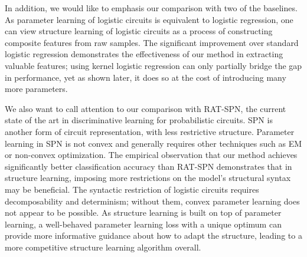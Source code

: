 \documentclass[letterpaper]{article} %
\begin{document}
In addition, we would like to emphasis our comparison with two of the baselines. As parameter learning of logistic circuits is equivalent to logistic regression, one can view structure learning of logistic circuits as a process of constructing composite features from raw samples.
The significant improvement over standard logistic regression demonstrates the effectiveness of our method in extracting valuable features; using kernel logistic regression can only partially bridge the gap in performance, yet as shown later, it does so at the cost of introducing many more parameters.

We also want to call attention to our comparison with RAT-SPN, the current state of the art in discriminative learning for probabilistic circuits. SPN is another form of circuit representation, with less restrictive structure. Parameter learning in SPN is not convex and generally requires other techniques such as EM or non-convex optimization. The empirical observation that our method achieves significantly better classification accuracy than RAT-SPN demonstrates that in structure learning, imposing more restrictions on the model's structural syntax may be beneficial. The syntactic restriction of logistic circuits requires decomposability and determinism; without them, convex parameter learning does not appear to be possible.
As structure learning is built on top of parameter learning, a well-behaved parameter learning loss with a unique optimum can provide more informative guidance about how to adapt the structure, leading to a more competitive structure learning algorithm overall.
\end{document}
